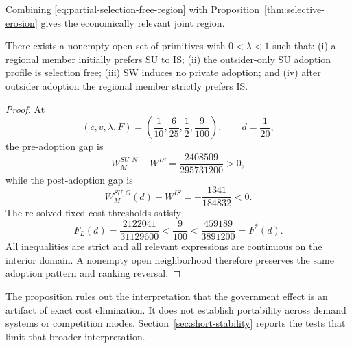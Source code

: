 Combining \eqref{eq:partial-selection-free-region} with Proposition~\ref{thm:selective-erosion} gives the economically relevant joint region.

\begin{proposition}
\label{prop:incomplete-adaptation-open-set}
There exists a nonempty open set of primitives with $0<\lambda<1$ such that: (i) a regional member initially prefers SU to IS; (ii) the outsider-only SU adoption profile is selection free; (iii) SW induces no private adoption; and (iv) after outsider adoption the regional member strictly prefers IS.
\end{proposition}

\begin{proof}
At
\[
(c,v,\lambda,F)
=
\left(
\frac1{10},
\frac6{25},
\frac12,
\frac9{100}
\right),
\qquad
d=\frac1{20},
\]
the pre-adoption gap is
\[
W_M^{SU,N}-W^{IS}
=
\frac{2408509}{295731200}>0,
\]
while the post-adoption gap is
\[
W_M^{SU,O}(d)-W^{IS}
=
-\frac{1341}{184832}<0.
\]
The re-solved fixed-cost thresholds satisfy
\[
F_L(d)
=
\frac{2122041}{31129600}
<
\frac9{100}
<
\frac{459189}{3891200}
=
F^*(d).
\]
All inequalities are strict and all relevant expressions are continuous on the interior domain. A nonempty open neighborhood therefore preserves the same adoption pattern and ranking reversal.
\end{proof}

The proposition rules out the interpretation that the government effect is an artifact of exact cost elimination. It does not establish portability across demand systems or competition modes. Section~\ref{sec:short-stability} reports the tests that limit that broader interpretation.


